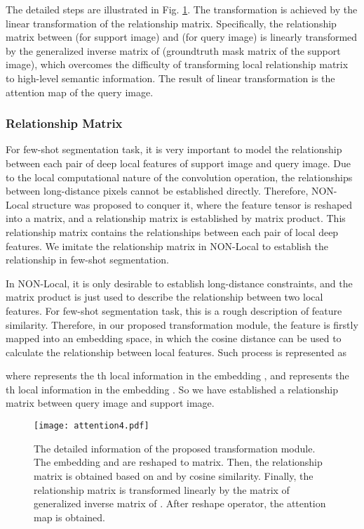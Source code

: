 \documentclass[runningheads]{llncs}
\begin{document}
The detailed steps are illustrated in Fig. \ref{fig2}. The transformation is achieved by the linear transformation of the relationship matrix. Specifically, the relationship matrix between  (for support image) and  (for query image) is linearly transformed by the generalized inverse matrix of  (groundtruth mask matrix of the support image), which overcomes the difficulty of transforming local relationship matrix to high-level semantic information. The result of linear transformation is the attention map  of the query image.

\subsubsection{Relationship Matrix}

For few-shot segmentation task, it is very important to model the relationship between each pair of deep local features of support image and query image. Due to the local computational nature of the convolution operation, the relationships between long-distance pixels cannot be established directly. 
Therefore, NON-Local\cite{ref_non_local} structure was proposed to conquer it,
where the feature tensor is reshaped into a matrix, and a relationship matrix is established by matrix product. This relationship matrix contains the relationships between each pair of local deep features.  We imitate the relationship matrix in NON-Local\cite{ref_non_local} to establish the relationship in few-shot segmentation.

 
In NON-Local\cite{ref_non_local}, it is only desirable to establish long-distance constraints, and the matrix product is just used to describe the relationship between two local features. For few-shot segmentation task, this is a rough description of feature similarity. Therefore, in our proposed transformation module, the feature is firstly mapped into an embedding space, in which the cosine distance can be used to calculate the relationship between local features. Such process is represented as

where  represents the th local information in the embedding , and  represents the th local information in the embedding . So we have established a relationship matrix  between query image and support image.
 
\begin{figure}
\texttt{[image: attention4.pdf]}
\caption{The detailed information of the proposed transformation module. The embedding  and  are reshaped to matrix. Then, the relationship matrix  is obtained based on  and  by cosine similarity. Finally, the relationship matrix  is transformed linearly by the matrix of generalized inverse matrix of . After reshape operator, the attention map  is obtained.} \label{fig2}
\end{figure}
\end{document}
